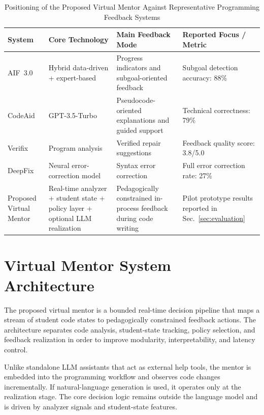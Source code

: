 \documentclass[conference]{IEEEtran}
\begin{document}
\begin{table}[t]
\centering
\caption{Positioning of the Proposed Virtual Mentor Against Representative Programming Feedback Systems}
\label{tab:feedback_comparison}
\renewcommand{\arraystretch}{1.2}
\begin{tabular}{p{2.5cm} p{3.5cm} p{4.8cm} p{3.9cm}}
\hline
\textbf{System} &
\textbf{Core Technology} &
\textbf{Main Feedback Mode} &
\textbf{Reported Focus / Metric} \\
\hline

AIF~3.0 \cite{AdaptiveImmediateFeedbackforBlockBasedProgramming} &
Hybrid data-driven + expert-based &
Progress indicators and subgoal-oriented feedback &
Subgoal detection accuracy: 88\% \\

CodeAid \cite{CodeAid} &
GPT-3.5-Turbo &
Pseudocode-oriented explanations and guided support &
Technical correctness: 79\% \\

Verifix \cite{NavigatingAutomatedFeedback} &
Program analysis &
Verified repair suggestions &
Feedback quality score: 3.8/5.0 \\

DeepFix \cite{NavigatingAutomatedFeedback} &
Neural error-correction model &
Syntax error correction &
Full error correction rate: 27\% \\

Proposed Virtual Mentor &
Real-time analyzer + student state + policy layer + optional LLM realization &
Pedagogically constrained in-process feedback during code writing &
Pilot prototype results reported in Sec.~\ref{sec:evaluation} \\

\hline
\end{tabular}
\end{table}

\section{Virtual Mentor System Architecture}

The proposed virtual mentor is a bounded real-time decision pipeline that maps a stream of student code states to pedagogically constrained feedback actions. The architecture separates code analysis, student-state tracking, policy selection, and feedback realization in order to improve modularity, interpretability, and latency control.

Unlike standalone LLM assistants that act as external help tools, the mentor is embedded into the programming workflow and observes code changes incrementally. If natural-language generation is used, it operates only at the realization stage. The core decision logic remains outside the language model and is driven by analyzer signals and student-state features.
\end{document}
